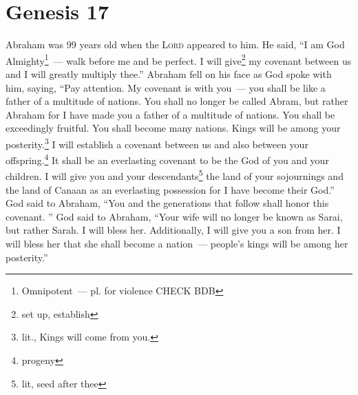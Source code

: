 \section{Genesis 17}\label{Genesis 17}
\begin{enumerate}[align=center]
     Abraham was 99 years old when the \textsc{Lord} appeared to him. He said, ``I am God Almighty\footnote{Omnipotent~--- pl. for violence CHECK BDB}~--- walk before me and be perfect.%
     I will give\footnote{set up, establish} my covenant between us and I will greatly multiply thee.''%
     Abraham fell on his face as God spoke with him, saying,%
     ``Pay attention. My covenant is with you~--- you shall be like a father of a multitude of nations.%
     You shall no longer be called Abram, but rather Abraham for I have made you a father of a multitude of nations.%
     You shall be exceedingly fruitful. You shall become many nations. Kings will be among your posterity.\footnote{lit., Kings will come from you.}%
     I will establish a covenant between us and also between your offspring.\footnote{progeny} It shall be an everlasting covenant to be the God of you and your children.%
     I will give you and your descendants\footnote{lit, seed after thee} the land of your sojournings and the land of Canaan as an everlasting possession for I have become their God.''%
     God said to Abraham, ``You and the generations that follow shall honor this covenant.%
     ''%
     God said to Abraham, ``Your wife will no longer be known as Sarai, but rather Sarah.%
     I will bless her. Additionally, I will give you a son from her. I will bless her that she shall become a nation~--- people's kings will be among her posterity.''%
\end{enumerate}
